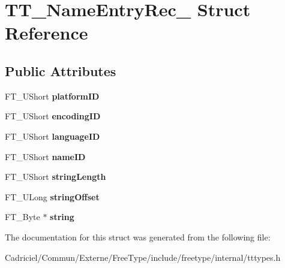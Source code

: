 \hypertarget{struct_t_t___name_entry_rec__}{\section{T\-T\-\_\-\-Name\-Entry\-Rec\-\_\- Struct Reference}
\label{struct_t_t___name_entry_rec__}
}
\subsection*{Public Attributes}
\begin{DoxyCompactItemize}
\item 
\hypertarget{struct_t_t___name_entry_rec___a9d4ee8bc42ed087f4533b6f664c0f6c6}{F\-T\-\_\-\-U\-Short {\bfseries platform\-I\-D}}\label{struct_t_t___name_entry_rec___a9d4ee8bc42ed087f4533b6f664c0f6c6}

\item 
\hypertarget{struct_t_t___name_entry_rec___a8e7403a2f37c7f7fdb3c19e9549d315c}{F\-T\-\_\-\-U\-Short {\bfseries encoding\-I\-D}}\label{struct_t_t___name_entry_rec___a8e7403a2f37c7f7fdb3c19e9549d315c}

\item 
\hypertarget{struct_t_t___name_entry_rec___a2ec03c0ff0c542f403b45a515bb20afb}{F\-T\-\_\-\-U\-Short {\bfseries language\-I\-D}}\label{struct_t_t___name_entry_rec___a2ec03c0ff0c542f403b45a515bb20afb}

\item 
\hypertarget{struct_t_t___name_entry_rec___abdaaec01d6620b3801f233cde5964548}{F\-T\-\_\-\-U\-Short {\bfseries name\-I\-D}}\label{struct_t_t___name_entry_rec___abdaaec01d6620b3801f233cde5964548}

\item 
\hypertarget{struct_t_t___name_entry_rec___a736e5f8caeada86cc33f62acca6537f5}{F\-T\-\_\-\-U\-Short {\bfseries string\-Length}}\label{struct_t_t___name_entry_rec___a736e5f8caeada86cc33f62acca6537f5}

\item 
\hypertarget{struct_t_t___name_entry_rec___a33ed41d4d3c4fffa74193f3b52e11870}{F\-T\-\_\-\-U\-Long {\bfseries string\-Offset}}\label{struct_t_t___name_entry_rec___a33ed41d4d3c4fffa74193f3b52e11870}

\item 
\hypertarget{struct_t_t___name_entry_rec___aefa752d5c88149f8e64122e14855d831}{F\-T\-\_\-\-Byte $\ast$ {\bfseries string}}\label{struct_t_t___name_entry_rec___aefa752d5c88149f8e64122e14855d831}

\end{DoxyCompactItemize}


The documentation for this struct was generated from the following file\-:\begin{DoxyCompactItemize}
\item 
Cadriciel/\-Commun/\-Externe/\-Free\-Type/include/freetype/internal/tttypes.\-h\end{DoxyCompactItemize}
